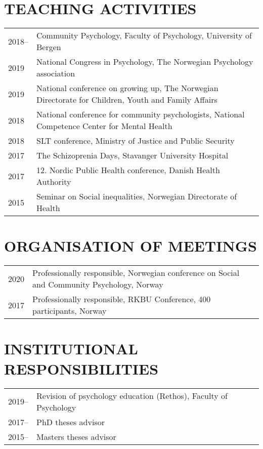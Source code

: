 \documentclass[11pt,a4paper,a4paper]{article}
\begin{document}
\hypertarget{teaching-activities}{%
\section{TEACHING ACTIVITIES}\label{teaching-activities}}

\begin{tabular}{ll}
  2018-- & Community Psychology, Faculty of Psychology, University of Bergen \\ 
  2019 & National Congress in Psychology, The Norwegian Psychology association \\ 
  2019 & National conference on growing up, The Norwegian Directorate for Children, Youth and Family Affairs \\ 
  2018 & National conference for community psychologists, National Competence Center for Mental Health \\ 
  2018 & SLT conference, Ministry of Justice and Public Security \\ 
  2017 & The Schizoprenia Days, Stavanger University Hospital \\ 
  2017 & 12. Nordic Public Health conference, Danish Health Authority \\ 
  2015 & Seminar on Social inequalities, Norwegian Directorate of Health \\ 
  \end{tabular}

\hypertarget{organisation-of-meetings}{%
\section{ORGANISATION OF MEETINGS}\label{organisation-of-meetings}}

\begin{tabular}{ll}
  2020 & Professionally responsible, Norwegian conference on Social and Community Psychology, Norway \\ 
  2017 & Professionally responsible, RKBU Conference, 400 participants, Norway \\ 
  \end{tabular}

\hypertarget{institutional-responsibilities}{%
\section{INSTITUTIONAL RESPONSIBILITIES}\label{institutional-responsibilities}}

\begin{tabular}{ll}
  2019-- & Revision of psychology education (Rethos), Faculty of Psychology \\ 
  2017-- & PhD theses advisor \\ 
  2015-- & Masters theses advisor \\ 
  \end{tabular}
\end{document}

